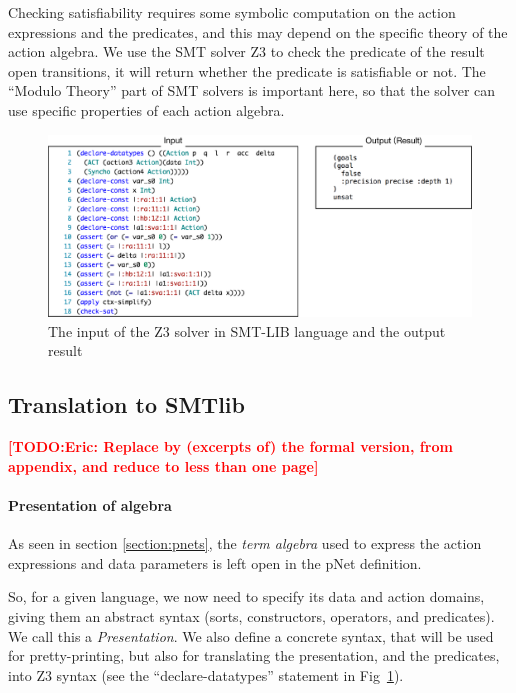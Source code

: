 \documentclass{lncs/llncs}
\newcommand{\TODO}[1]{\textcolor{red}{\textbf{[TODO:#1]}}}
\begin{document}
Checking satisfiability requires some symbolic computation
on the action expressions and the predicates, and this 
may depend on the specific theory of the action algebra. 
We use the SMT solver Z3 to check the predicate of the result open transitions, 
it will return whether the predicate is satisfiable or not.
The ``Modulo Theory'' part of SMT solvers is important here, so that
the solver can use specific properties of each action algebra.


\begin{figure}[t]
    \centerline{\includegraphics[width=\linewidth]{XFIG/SMTLIB2}}
  \caption{The input of the Z3 solver in SMT-LIB language and the output result}  \label{schema:smt-lib}
\end{figure}


\subsection{Translation to SMTlib}

\TODO{Eric: Replace by (excerpts of) the formal version, from appendix, and reduce to less than one page}

\paragraph{Presentation of algebra}


As seen in section
\ref{section:pnets}, the \emph{term algebra} used to express the
action expressions and data parameters is left open in
the pNet definition.

So, for a given language, we now need to specify its data and action
domains, giving them an abstract syntax (sorts, constructors, operators,
and predicates). We call this a \emph{Presentation}.
We also define a concrete syntax, that will be used for
pretty-printing, but also for translating the presentation, and the
predicates, into Z3 syntax (see the ``declare-datatypes'' statement in
Fig~\ref{schema:smt-lib}). 
\end{document}
